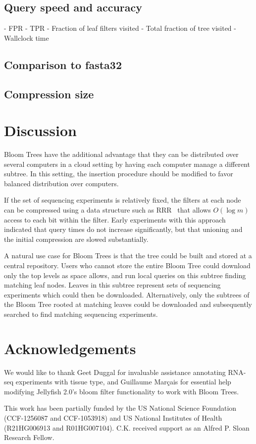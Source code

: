 \documentclass[11pt]{article}
\begin{document}
\subsection{Query speed and accuracy}

- FPR
- TPR
- Fraction of leaf filters visited 
- Total fraction of tree visited
- Wallclock time

\subsection{Comparison to fasta32}

\subsection{Compression size}

\section{Discussion}

Bloom Trees have the additional advantage that they can be distributed over several computers in a cloud setting by having each computer manage a different subtree. In this setting, the insertion procedure should be modified to favor balanced distribution over computers.

If the set of sequencing experiments is relatively fixed, the filters at each node can be compressed using a data structure such as RRR~\cite{rrr} that allows $O(\log m)$ access to each bit within the filter. Early experiments with this approach indicated that query times do not increase significantly, but that unioning and the initial compression are slowed substantially.

A natural use case for Bloom Trees is that the tree could be built and stored at a central repository. Users who cannot store the entire Bloom Tree could download only the top levels as space allows, and run local queries on this subtree finding matching leaf nodes. Leaves in this subtree represent sets of sequencing experiments which could then be downloaded. Alternatively, only the subtrees of the Bloom Tree rooted at matching leaves could be downloaded and subsequently searched to find matching sequencing experiments.

\section*{Acknowledgements}

We would like to thank Geet Duggal for invaluable assistance annotating RNA-seq experiments with tissue type, and Guillaume Mar\c{c}ais for essential help modifying Jellyfish 2.0's bloom filter functionality to work with Bloom Trees. 

This work has been partially funded by the US National Science Foundation (CCF-1256087 and CCF-1053918) and US National Institutes of Health (R21HG006913 and R01HG007104). C.K. received support as an Alfred P. Sloan Research Fellow. 



\end{document}
